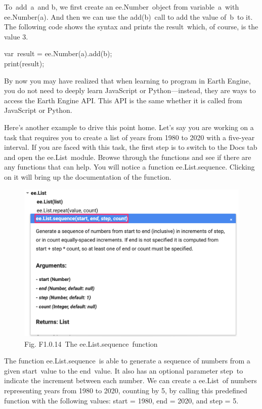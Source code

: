 \documentclass[
  letterpaper,
  DIV=11,
  numbers=noendperiod]{scrreprt}
\begin{document}
To~add~a~and b, we first create an ee.Number~object from variable~a~with
ee.Number(a). And then we can use the add(b)~call to add the value
of~b~to it. The following code shows the syntax and prints the
result~which, of course, is the value 3.~

var~result = ee.Number(a).add(b);\\
print(result);

By now you may have realized that when learning to program in Earth
Engine, you do not need to deeply learn JavaScript or Python---instead,
they are ways to access the Earth Engine API. This API is the same
whether it is called from JavaScript or Python.

Here's another example to drive this point home. Let's say you are
working on a task that requires you to create a list of years from 1980
to 2020 with a five-year interval. If you are faced with this task, the
first step is to switch to the Docs tab and open the ee.List~module.
Browse through the functions and see if there are any functions that can
help. You will notice a function ee.List.sequence. Clicking on it will
bring up the documentation of the function.

\begin{figure}

{\centering \includegraphics{./F1/image65.png}

}

\caption{Fig. F1.0.14~The ee.List.sequence~function}

\end{figure}

The function ee.List.sequence~is able to generate a sequence of numbers
from a given start~value to the end~value. It also has an optional
parameter step~to indicate the increment between each number. We can
create a ee.List~of numbers representing years from 1980 to 2020,
counting by 5, by calling this predefined function with the following
values: start = 1980, end = 2020, and step = 5.
\end{document}
